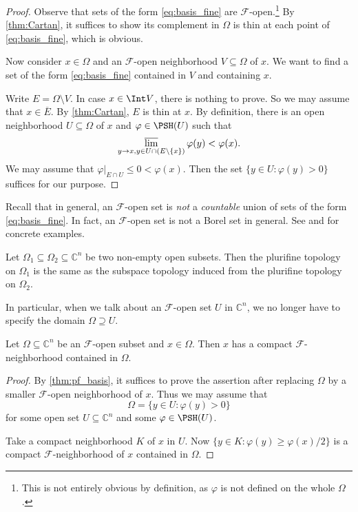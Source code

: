 \begin{proof}
  Observe that sets of the form \eqref{eq:basis_fine} are $\mathcal{F}$-open.\footnote{This is not entirely obvious by definition, as $\varphi$ is not defined on the whole $\Omega$.} By \cref{thm:Cartan}, it suffices to show its complement in $\Omega$ is thin at each point of \eqref{eq:basis_fine}, which is obvious.

  Now consider $x\in \Omega$ and an $\mathcal{F}$-open neighborhood $V\subseteq \Omega$ of $x$. We want to find a set of the form \eqref{eq:basis_fine} contained in $V$ and containing $x$.

  Write $E=\Omega\setminus V$. In case $x\in \Int V$, there is nothing to prove. So we may assume that $x\in \overline{E}$. By \cref{thm:Cartan}, $E$ is thin at $x$. By definition, there is an open neighborhood $U\subseteq \Omega$ of $x$ and $\varphi\in \PSH(U)$ such that
  \[
    \varlimsup_{y\to x,y\in U\cap (E\setminus\{x\})}\varphi(y)<\varphi(x).
  \]
  We may assume that $\varphi|_{E\cap U}\leq 0<\varphi(x)$. Then the set $\{y\in U:\varphi(y)>0\}$ suffices for our purpose.
\end{proof}

\begin{remark}
    Recall that in general, an $\mathcal{F}$-open set is \emph{not} a \emph{countable} union of sets of the form \eqref{eq:basis_fine}. In fact, an $\mathcal{F}$-open set is not a Borel set in general.
    See \cite{EK23} and \cite[Example~10.3.5]{FPT} for concrete examples.
\end{remark}

\begin{corollary}\label{cor:pf_compatible}
  Let $\Omega_1\subseteq \Omega_2\subseteq \mathbb{C}^n$ be two non-empty open subsets. Then the plurifine topology on $\Omega_1$ is the same as the subspace topology induced from the plurifine topology on $\Omega_2$.
\end{corollary}
In particular, when we talk about an $\mathcal{F}$-open set $U$ in $\mathbb{C}^n$, we no longer have to specify the domain $\Omega\supseteq U$.

\begin{corollary}\label{cor:compactnhformbase}
  Let $\Omega\subseteq \mathbb{C}^n$ be an $\mathcal{F}$-open subset and $x\in \Omega$. Then $x$ has a compact $\mathcal{F}$-neighborhood contained in $\Omega$.
\end{corollary}
\begin{proof}
  By \cref{thm:pf_basis}, it suffices to prove the assertion after replacing $\Omega$ by a smaller $\mathcal F$-open neighborhood of $x$. Thus we may assume that
    \[
        \Omega=\{y\in U:\varphi(y)>0\}
    \]
    for some open set $U\subseteq\mathbb C^n$ and some $\varphi\in\PSH(U)$.

  Take a compact neighborhood $K$ of $x$ in $U$. Now $\{y\in K: \varphi(y)\geq \varphi(x)/2\}$ is a compact $\mathcal{F}$-neighborhood of $x$ contained in $\Omega$.
\end{proof}

